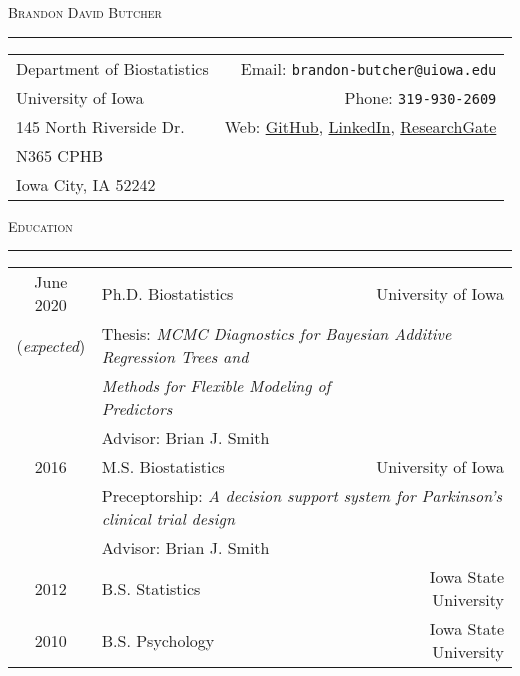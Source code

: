 \documentclass[a4paper]{article}
\newcommand{\LinkedIn}{\href{https://www.linkedin.com/in/brandon-butcher-72250153/}{LinkedIn}}
\newcommand{\ResearchGate}{\href{https://www.researchgate.net/profile/Brandon_Butcher}{ResearchGate}}
\newcommand{\GitHub}{\href{https://github.com/brandondbutcher}{GitHub}}
\begin{document}
\begin{center}
  \Huge\textsc{Brandon David Butcher}
  \textcolor{usafagrey}{\rule{\textwidth}{1pt}}
\end{center}


\begin{tabular*}{0.95\textwidth}{@{\extracolsep{\fill}}lr}
  Department of Biostatistics & Email: \texttt{brandon-butcher@uiowa.edu} \\
  University of Iowa & Phone: \texttt{319-930-2609} \\
  145 North Riverside Dr.  & Web: \GitHub, \LinkedIn, \ResearchGate \\
  N365 CPHB & \\
  Iowa City, IA 52242 &  \\
\end{tabular*}
\vspace{\baselineskip}


\begin{flushleft}
  \Large\textsc{Education}
  \textcolor{usafagrey}{\rule[0.5\baselineskip]{\textwidth}{0.75pt}}
\end{flushleft}
\vspace{-\baselineskip}

\begin{tabular*}{0.96\textwidth}{@{\extracolsep{\fill}}clr}
  June 2020 & Ph.D. Biostatistics & University of Iowa \\
 (\textit{expected}) & \multicolumn{2}{l}{Thesis: \textit{
  MCMC Diagnostics for Bayesian Additive Regression Trees and}} \\
   & \textit{\qquad \qquad Methods for Flexible Modeling of Predictors} & \\
   & Advisor: Brian J. Smith & \\[3pt]
  2016 & M.S. Biostatistics & University of Iowa \\
   & \multicolumn{2}{l}{
    Preceptorship: \textit{
      A decision support system for Parkinson's clinical trial design
   }} \\
   & Advisor: Brian J. Smith & \\[3pt]
  2012 & B.S. Statistics & Iowa State University \\
  2010 & B.S. Psychology & Iowa State University
\end{tabular*}
\vspace{0.25\baselineskip}


%
\end{document}
